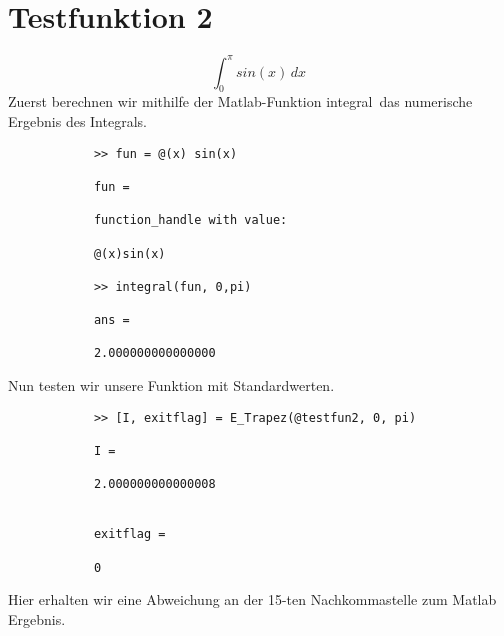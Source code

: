 \documentclass[11pt,titlepage]{article}
\begin{document}
	\section{Testfunktion 2}
		\begin{displaymath}
			\int_0^{\pi} sin(x) \, dx\
		\end{displaymath}
		Zuerst berechnen wir mithilfe der Matlab-Funktion \glqq integral\grqq \, das numerische Ergebnis des Integrals.
		\begin{lstlisting}
			>> fun = @(x) sin(x)
			
			fun =
			
			function_handle with value:
			
			@(x)sin(x)
			
			>> integral(fun, 0,pi)
			
			ans =
			
			2.000000000000000
		\end{lstlisting}
		Nun testen wir unsere Funktion mit Standardwerten.
		\begin{lstlisting}
			>> [I, exitflag] = E_Trapez(@testfun2, 0, pi)
			
			I =
			
			2.000000000000008
			
			
			exitflag =
			
			0
		\end{lstlisting}
		Hier erhalten wir eine Abweichung an der 15-ten Nachkommastelle zum Matlab Ergebnis.
	
\end{document}
